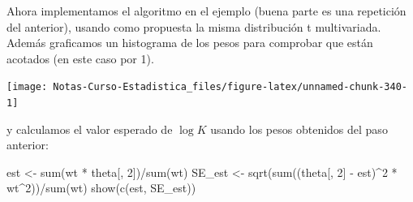 \documentclass[
  12pt,
]{book}
\newenvironment{Shaded}{\begin{snugshade}}{\end{snugshade}}
\newcommand{\AttributeTok}[1]{\textcolor[rgb]{0.77,0.63,0.00}{#1}}
\newcommand{\ConstantTok}[1]{\textcolor[rgb]{0.00,0.00,0.00}{#1}}
\newcommand{\DecValTok}[1]{\textcolor[rgb]{0.00,0.00,0.81}{#1}}
\newcommand{\FunctionTok}[1]{\textcolor[rgb]{0.00,0.00,0.00}{#1}}
\newcommand{\NormalTok}[1]{#1}
\newcommand{\OtherTok}[1]{\textcolor[rgb]{0.56,0.35,0.01}{#1}}
\newcommand{\SpecialCharTok}[1]{\textcolor[rgb]{0.00,0.00,0.00}{#1}}
\theoremstyle{definition}
\theoremstyle{definition}
\theoremstyle{definition}
\theoremstyle{definition}
\theoremstyle{remark}
\begin{document}
Ahora implementamos el algoritmo en el ejemplo (buena parte es una repetición del anterior), usando como propuesta la misma distribución t multivariada. Además graficamos un histograma de los pesos para comprobar que están acotados (en este caso por 1).

\begin{Shaded}
\end{Shaded}

\begin{center}\texttt{[image: Notas-Curso-Estadistica\_files/figure-latex/unnamed-chunk-340-1]} \end{center}

y calculamos el valor esperado de \(\log K\) usando los pesos obtenidos del paso anterior:

\begin{Shaded}
\begin{Highlighting}[]
\NormalTok{est }\OtherTok{\textless{}{-}} \FunctionTok{sum}\NormalTok{(wt }\SpecialCharTok{*}\NormalTok{ theta[, }\DecValTok{2}\NormalTok{])}\SpecialCharTok{/}\FunctionTok{sum}\NormalTok{(wt)}
\NormalTok{SE\_est }\OtherTok{\textless{}{-}} \FunctionTok{sqrt}\NormalTok{(}\FunctionTok{sum}\NormalTok{((theta[, }\DecValTok{2}\NormalTok{] }\SpecialCharTok{{-}}\NormalTok{ est)}\SpecialCharTok{\^{}}\DecValTok{2} \SpecialCharTok{*}\NormalTok{ wt}\SpecialCharTok{\^{}}\DecValTok{2}\NormalTok{))}\SpecialCharTok{/}\FunctionTok{sum}\NormalTok{(wt)}
\FunctionTok{show}\NormalTok{(}\FunctionTok{c}\NormalTok{(est, SE\_est))}
\end{Highlighting}
\end{Shaded}
\end{document}
